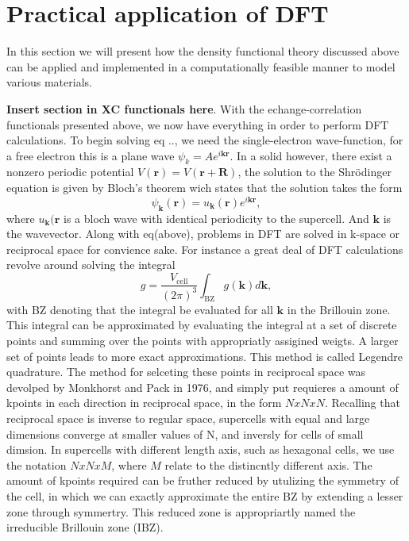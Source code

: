\chapter{Practical application of DFT}
\label{sec:Practical DFT}

In this section we will present how the density functional theory discussed above can be applied and implemented in a computationally feasible manner to model various materials.

\textbf{Insert section in XC functionals here}.
With the echange-correlation functionals presented above, we now have everything in order to perform DFT calculations. To begin solving eq .., we need the single-electron wave-function, for a free electron this is a plane wave $\psi_k = Ae^{i\boldsymbol{k}\boldsymbol{r}}$. In a solid however, there exist a nonzero periodic potential $V(\boldsymbol{r}) = V(\boldsymbol{r} + \boldsymbol{R})$, the solution to the Shr\"{o}dinger equation is given by Bloch's theorem wich states that the solution takes the form
\begin{equation}
\psi_{\boldsymbol{k}}(\boldsymbol{r}) = u_{\boldsymbol{k}}(\boldsymbol{r})e^{i\boldsymbol{k}\boldsymbol{r}},    
\end{equation}
where $u_{\boldsymbol{k}}(\boldsymbol{r}$ is a bloch wave with identical periodicity to the supercell. And $\boldsymbol{k}$ is the wavevector. Along with eq(above), problems in DFT are solved in k-space or reciprocal space for convience sake. For instance a great deal of DFT calculations revolve around solving the integral 
\begin{equation}
    g = \frac{V_{\text{cell}}}{(2\pi)^3} \int_{\text{BZ}} g(\boldsymbol{k})d\boldsymbol{k},
\end{equation}
with BZ denoting that the integral be evaluated for all $\boldsymbol{k}$ in the Brillouin zone. This integral can be approximated by evaluating the integral at a set of discrete points and summing over the points with appropriatly assigined weigts. A larger set of points leads to more exact approximations. This method is called Legendre quadrature. The method for selceting these points in reciprocal space was devolped by Monkhorst and Pack in 1976, and simply put requieres a amount of kpoints in each direction in reciprocal space, in the form $N x N x N$. Recalling that reciprocal space is inverse to regular space, supercells with equal and large dimensions converge at smaller values of N, and inversly for cells of small dimsion. In supercells with different length axis, such as hexagonal cells, we use the notation $N x N x M$, where $M$ relate to the distincntly different axis. The amount of kpoints required can be fruther reduced by utulizing the symmetry of the cell, in which we can exactly approximate the entire BZ by extending a lesser zone through symmertry. This reduced zone is appropriartly named the irreducible Brillouin zone (IBZ). 

